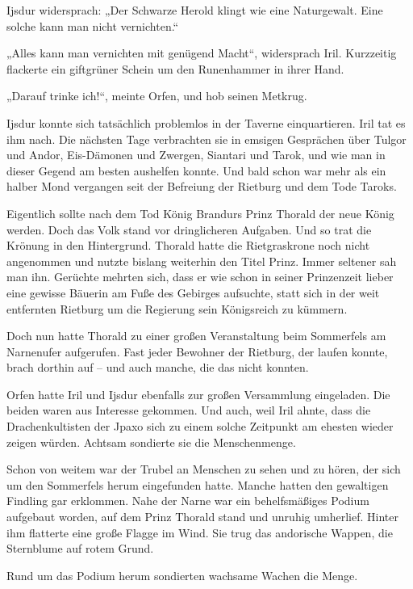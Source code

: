 Ijsdur widersprach: „Der Schwarze Herold klingt wie eine Naturgewalt. Eine solche kann man nicht vernichten.“

„Alles kann man vernichten mit genügend Macht“, widersprach Iril. Kurzzeitig flackerte ein giftgrüner Schein um den Runenhammer in ihrer Hand.

„Darauf trinke ich!“, meinte Orfen, und hob seinen Metkrug.\bigskip







Ijsdur konnte sich tatsächlich problemlos in der Taverne einquartieren. Iril tat es ihm nach. Die nächsten Tage verbrachten sie in emsigen Gesprächen über Tulgor und Andor, Eis-Dämonen und Zwergen, Siantari und Tarok, und wie man in dieser Gegend am besten aushelfen konnte. Und bald schon war mehr als ein halber Mond vergangen seit der Befreiung der Rietburg und dem Tode Taroks.

Eigentlich sollte nach dem Tod König Brandurs Prinz Thorald der neue König werden. Doch das Volk stand vor dringlicheren Aufgaben. Und so trat die Krönung in den Hintergrund. Thorald hatte die Rietgraskrone noch nicht angenommen und nutzte bislang weiterhin den Titel Prinz. Immer seltener sah man ihn. Gerüchte mehrten sich, dass er wie schon in seiner Prinzenzeit lieber eine gewisse Bäuerin am Fuße des Gebirges aufsuchte, statt sich in der weit entfernten Rietburg um die Regierung sein Königsreich zu kümmern.

Doch nun hatte Thorald zu einer großen Veranstaltung beim Sommerfels am Narnenufer aufgerufen. Fast jeder Bewohner der Rietburg, der laufen konnte, brach dorthin auf – und auch manche, die das nicht konnten.

Orfen hatte Iril und Ijsdur ebenfalls zur großen Versammlung eingeladen. Die beiden waren aus Interesse gekommen. Und auch, weil Iril ahnte, dass die Drachenkultisten der Jpaxo sich zu einem solche Zeitpunkt am ehesten wieder zeigen würden. Achtsam sondierte sie die Menschenmenge.

Schon von weitem war der Trubel an Menschen zu sehen und zu hören, der sich um den Sommerfels herum eingefunden hatte. Manche hatten den gewaltigen Findling gar erklommen. Nahe der Narne war ein behelfsmäßiges Podium aufgebaut worden, auf dem Prinz Thorald stand und unruhig umherlief. Hinter ihm flatterte eine große Flagge im Wind. Sie trug das andorische Wappen, die Sternblume auf rotem Grund.

Rund um das Podium herum sondierten wachsame Wachen die Menge.

